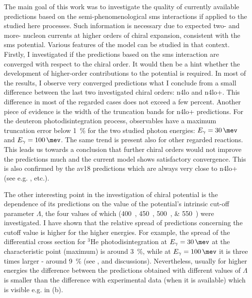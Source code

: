 The main goal of this work was to investigate the quality of currently available
predictions based on the semi-phenomenological \gls{sms}
interactions if applied to the studied here processes.
Such information is necessary due to expected two- and more- nucleon currents
at higher orders of chiral expansion, consistent with the \gls{sms} potential.
Various features of the model can be studied in that context.
Firstly, I investigated if the predictions based on the \gls{sms} interaction
are converged with respect to the chiral order.
It would then be a hint whether the development of higher-order contributions to the potential is required.
In most of the results, I observe very converged predictions what I conclude from a small difference
between the last two investigated chiral orders: \gls{n4lo} and \gls{n4lo+}. This
difference in most of the regarded cases does not exceed a few percent.
Another piece of evidence is the width of the truncation bands for \gls{n4lo+} predictions.
For the deuteron photodisintegration process, observables have a maximum
truncation error below \SI{1}{\percent} for the two studied photon energies:
$E_\gamma=\SI{30}{\mev}$ and $E_\gamma=\SI{100}{\mev}$.
The same trend is present also for other regarded reactions.
This leads us towards a conclusion that further chiral orders would not
improve the predictions much and the current model shows satisfactory convergence.
This is also confirmed by the \gls{av18} predictions which are
always very close to \gls{n4lo+} (see e.g. ,  etc.).

The other interesting point in the investigation of chiral potential is the dependence of its predictions
on the value of the potential's intrinsic cut-off parameter $\Lambda$, the four values of which (\SIlist[list-units = single]{400;450;500;550}{\mev}) 
were investigated. I have shown that the relative spread of predictions 
concerning the cutoff value is higher for the higher energies.
For example, the spread of the differential cross section for $^3$He photodisintegration
at $E_\gamma=\SI{30}{\mev}$ at the characteristic point (maximum) is around \SI{3}{\percent},
while at $E_\gamma=\SI{100}{\mev}$ it is three times larger - around \SI{9}{\percent}
(see ,  and discussions).
Nevertheless, usually for higher energies the difference between the predictions
obtained with different values of $\Lambda$ is smaller than the difference with experimental
data (when it is available) which is visible e.g. in (b).

